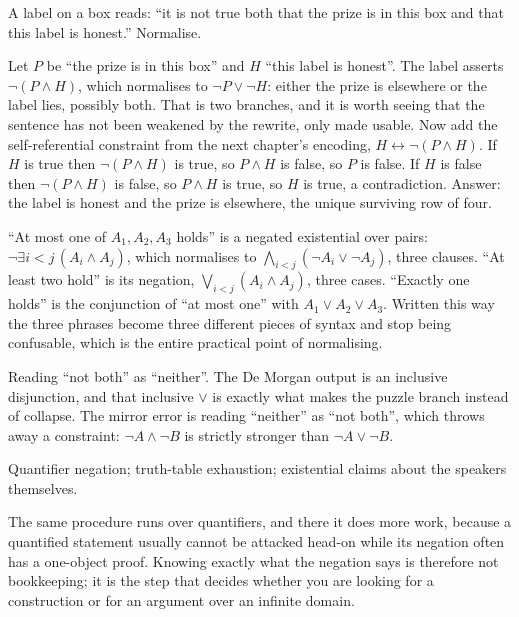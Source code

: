 \begin{worked}
A label on a box reads: ``it is not true both that the prize is in this box and that this label is honest.'' Normalise.

Let $P$ be ``the prize is in this box'' and $H$ ``this label is honest''. The label asserts $\lnot(P\wedge H)$, which normalises to $\lnot P\vee\lnot H$: either the prize is elsewhere or the label lies, possibly both. That is two branches, and it is worth seeing that the sentence has not been weakened by the rewrite, only made usable. Now add the self-referential constraint from the next chapter's encoding, $H\leftrightarrow\lnot(P\wedge H)$. If $H$ is true then $\lnot(P\wedge H)$ is true, so $P\wedge H$ is false, so $P$ is false. If $H$ is false then $\lnot(P\wedge H)$ is false, so $P\wedge H$ is true, so $H$ is true, a contradiction. Answer: the label is honest and the prize is elsewhere, the unique surviving row of four.
\end{worked}

\begin{worked}
``At most one of $A_1,A_2,A_3$ holds'' is a negated existential over pairs: $\lnot\exists i<j\,(A_i\wedge A_j)$, which normalises to $\bigwedge_{i<j}(\lnot A_i\vee\lnot A_j)$, three clauses. ``At least two hold'' is its negation, $\bigvee_{i<j}(A_i\wedge A_j)$, three cases. ``Exactly one holds'' is the conjunction of ``at most one'' with $A_1\vee A_2\vee A_3$. Written this way the three phrases become three different pieces of syntax and stop being confusable, which is the entire practical point of normalising.
\end{worked}

\begin{trap}
Reading ``not both'' as ``neither''. The De Morgan output is an inclusive disjunction, and that inclusive $\vee$ is exactly what makes the puzzle branch instead of collapse. The mirror error is reading ``neither'' as ``not both'', which throws away a constraint: $\lnot A\wedge\lnot B$ is strictly stronger than $\lnot A\vee\lnot B$.
\end{trap}

\begin{seealsob}Quantifier negation; truth-table exhaustion; existential claims about the speakers themselves.\end{seealsob}

The same procedure runs over quantifiers, and there it does more work, because a quantified statement usually cannot be attacked head-on while its negation often has a one-object proof. Knowing exactly what the negation says is therefore not bookkeeping; it is the step that decides whether you are looking for a construction or for an argument over an infinite domain.

